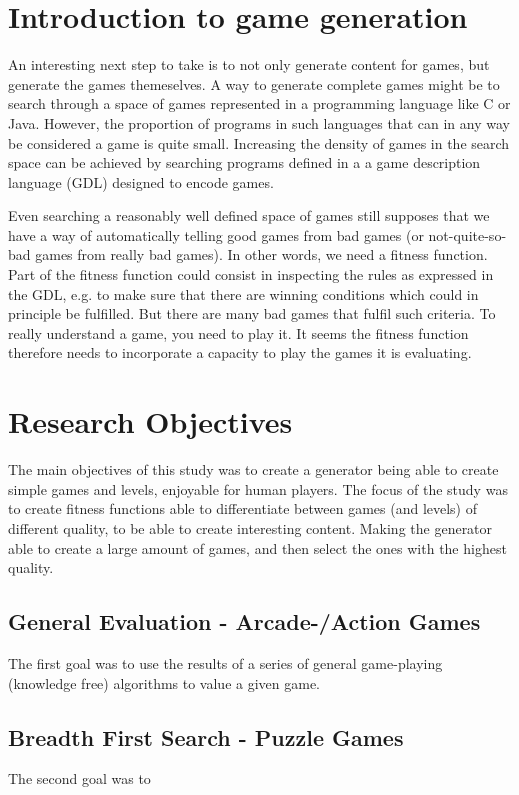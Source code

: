 \documentclass[a4paper,titlepage,final]{report}
\begin{document}
\section{Introduction to game generation}
An interesting next step to take is to not only generate content for games, but generate the games themeselves.
A way to generate complete games might be to search through a space of games represented in a programming language like C or Java. However, the proportion of programs in such languages that can in any way be considered a game is quite small. Increasing the density of games in the search space can be achieved by searching programs defined in a a game description language (GDL) designed to encode games. %

Even searching a reasonably well defined space of games still supposes that we have a way of automatically telling good games from bad games (or not-quite-so-bad games from really bad games). In other words, we need a fitness function. Part of the fitness function could consist in inspecting the rules as expressed in the GDL, e.g. to make sure that there are winning conditions which could in principle be fulfilled. But there are many bad games that fulfil such criteria. To really understand a game, you need to play it. It seems the fitness function therefore needs to incorporate a capacity to play the games it is evaluating. %

\section{Research Objectives}
The main objectives of this study was to create a generator being able to create simple games and levels, enjoyable for human players.
The focus of the study was to create fitness functions able to differentiate between games (and levels) of different quality, to be able to create interesting content. Making the generator able to create a large amount of games, and then select the ones with the highest quality.

\subsection{General Evaluation - Arcade-/Action Games}
The first goal was to use the results of a series of general game-playing (knowledge free) algorithms to value a given game.

\subsection{Breadth First Search - Puzzle Games}
The second goal was to 
\end{document}
